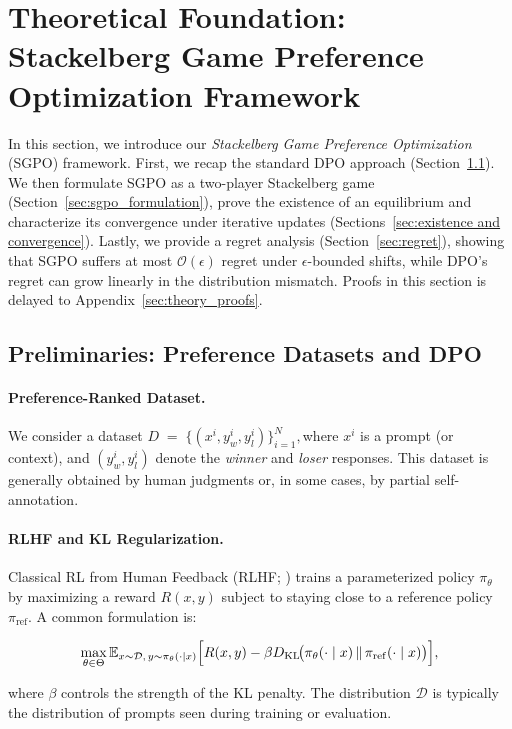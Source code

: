 \section{Theoretical Foundation: Stackelberg Game Preference Optimization Framework}
\label{sec:theory}
In this section, we introduce our \emph{Stackelberg Game Preference Optimization} (SGPO) framework. First, we recap the standard DPO approach (Section~\ref{sec:dpo_prelims}). We then formulate SGPO as a two-player Stackelberg game (Section~\ref{sec:sgpo_formulation}), prove the existence of an equilibrium and characterize its convergence under iterative updates (Sections~\ref{sec:existence and convergence}).  Lastly, we provide a regret analysis (Section~\ref{sec:regret}), showing that SGPO suffers at most $\mathcal{O}(\epsilon)$ regret under $\epsilon$-bounded shifts, while DPO’s regret can grow linearly in the distribution mismatch. Proofs in this section is delayed to Appendix~\ref{sec:theory_proofs}.

\subsection{Preliminaries: Preference Datasets and DPO}
\label{sec:dpo_prelims}

\paragraph{Preference-Ranked Dataset.}
We consider a dataset
$D \;=\; \{(x^i, y^i_w, y^i_l)\}_{i=1}^N,$where $x^i$ is a prompt (or context), and $(y^i_w, y^i_l)$ denote the \emph{winner} and \emph{loser} responses. This dataset is generally obtained by human judgments or, in some cases, by partial self-annotation.

\vspace{-0.1 in}
\paragraph{RLHF and KL Regularization.}
Classical RL from Human Feedback (RLHF; \citep{Christiano2017Deep}) trains a parameterized policy $\pi_\theta$ by maximizing a reward $R(x,y)$ subject to staying close to a reference policy $\pi_{\text{ref}}$.  A common formulation is:
\begin{small}
   \begin{equation}
\label{eq:rlhf_obj_appendix}
\max_{\theta \in \Theta}
\mathbb{E}_{x \sim \mathcal{D},\, y \sim \pi_\theta(\cdot \mid x)}
\Bigl[
  R(x,y)
  -
  \beta D_{\mathrm{KL}}\!\bigl(\pi_\theta(\cdot\mid x)\,\Vert\,\pi_{\mathrm{ref}}(\cdot\mid x)\bigr)
\Bigr],
\end{equation} 
\end{small}
\noindent 
where $\beta$ controls the strength of the KL penalty.  The distribution $\mathcal{D}$ is typically the distribution of prompts seen during training or evaluation.

